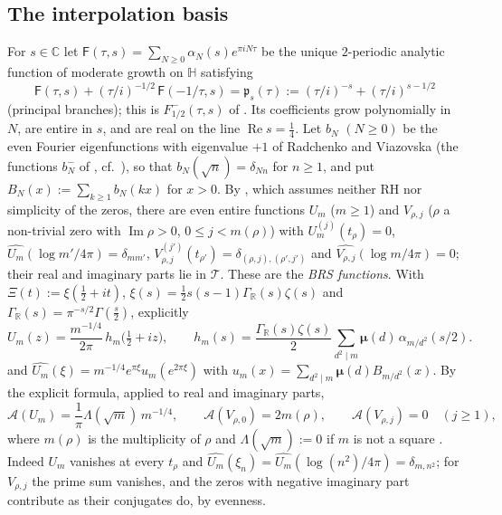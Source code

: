 \documentclass[11pt]{amsart}
\newcommand{\CC}{\mathbb C}
\renewcommand{\Re}{\operatorname{Re}}
\renewcommand{\Im}{\operatorname{Im}}
\newcommand{\xin}[1]{\xi_{#1}}
\newcommand{\GR}{\Gamma_{\mathbb R}}
\newcommand{\Arch}{\mathcal A}
\newcommand{\Tc}{\mathcal T}
\theoremstyle{definition}
\theoremstyle{remark}
\numberwithin{equation}{section}
\begin{document}
\subsection{The interpolation basis}\label{ssec:basis}
For $s\in\CC$ let $\mathsf F(\tau,s)=\sum_{N\ge0}\alpha_N(s)e^{\pi iN\tau}$ be the unique $2$-periodic analytic function of
moderate growth on $\mathbb H$ satisfying
\begin{equation}\label{eq:BRS-FE}
\mathsf F(\tau,s)+(\tau/i)^{-1/2}\,\mathsf F(-1/\tau,s)=\mathfrak p_s(\tau):=(\tau/i)^{-s}+(\tau/i)^{s-1/2}
\end{equation}
(principal branches); this is $F^-_{1/2}(\tau,s)$ of \cite[Theorem~3.1]{BRS}. Its coefficients grow polynomially in $N$, are entire
in $s$, and are real on the line $\Re s=\frac14$. Let $b_N$ $(N\ge0)$ be the even Fourier eigenfunctions with eigenvalue $+1$ of
Radchenko and Viazovska \cite{RV19} (the functions $b_N^-$ of \cite[\S3]{BRS}, cf.\ \cite[\S3.4.1]{BRS}), so that
$b_N(\sqrt n)=\delta_{Nn}$ for $n\ge1$, and put $B_N(x):=\sum_{k\ge1}b_N(kx)$ for $x>0$. By \cite[Theorem~1.1]{BRS}, which assumes
neither RH nor simplicity of the zeros, there are even entire functions $U_m$ ($m\ge1$) and $V_{\rho,j}$ ($\rho$ a non-trivial zero
with $\Im\rho>0$, $0\le j<m(\rho)$) with $U_m^{(j)}(t_\rho)=0$, $\widehat{U_m}(\log m'/4\pi)=\delta_{mm'}$,
$V_{\rho,j}^{(j')}(t_{\rho'})=\delta_{(\rho,j),(\rho',j')}$ and $\widehat{V_{\rho,j}}(\log m/4\pi)=0$; their real and imaginary parts lie in
$\Tc$. These are the \emph{BRS functions}. With $\Xi(t):=\xi(\frac12+it)$, $\xi(s)=\frac12s(s-1)\GR(s)\zeta(s)$ and $\GR(s)=\pi^{-s/2}\Gamma(\frac s2)$,
explicitly \cite[\S\S4.2--4.3]{BRS}
\begin{equation}\label{eq:Um}
U_m(z)=\frac{m^{-1/4}}{2\pi}\,h_m\big(\tfrac12+iz\big),\qquad h_m(s)=\frac{\GR(s)\zeta(s)}2\sum_{d^2\mid m}\boldsymbol\mu(d)\,\alpha_{m/d^2}(s/2).
\end{equation}
and $\widehat{U_m}(\xi)=m^{-1/4}e^{\pi\xi}u_m(e^{2\pi\xi})$ with $u_m(x)=\sum_{d^2\mid m}\boldsymbol\mu(d)B_{m/d^2}(x)$. By the explicit formula,
applied to real and imaginary parts,
\begin{equation}\label{eq:W-BRS}
\Arch(U_m)=\frac1\pi\Lambda(\sqrt m)\,m^{-1/4},\qquad \Arch(V_{\rho,0})=2m(\rho),\qquad \Arch(V_{\rho,j})=0\quad(j\ge1),
\end{equation}
where $m(\rho)$ is the multiplicity of $\rho$ and $\Lambda(\sqrt m):=0$ if $m$ is not a square \cite{PaperI}. Indeed $U_m$ vanishes at every
$t_\rho$ and $\widehat{U_m}(\xin n)=\widehat{U_m}(\log(n^2)/4\pi)=\delta_{m,n^2}$; for $V_{\rho,j}$ the prime sum vanishes, and the zeros with
negative imaginary part contribute as their conjugates do, by evenness.
\end{document}
